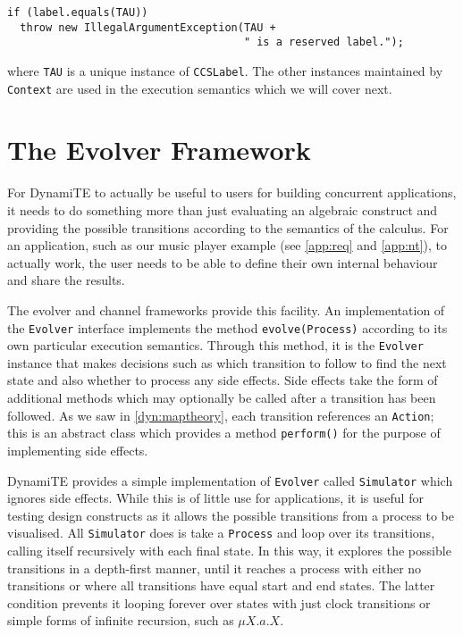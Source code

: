 \begin{verbatim}
if (label.equals(TAU))
  throw new IllegalArgumentException(TAU +
                                     " is a reserved label.");
\end{verbatim}

\noindent where \texttt{TAU} is a unique instance of
\texttt{CCSLabel}.  The other instances maintained by \texttt{Context}
are used in the execution semantics which we will cover next.

\section{The Evolver Framework}
\label{dyn:evolvers}

For DynamiTE to actually be useful to users for building concurrent
applications, it needs to do something more than just evaluating an
algebraic construct and providing the possible transitions according
to the semantics of the calculus.  For an application, such as our
music player example (see \ref{app:req} and \ref{app:nt}), to actually
work, the user needs to be able to define their own internal behaviour
and share the results.

The evolver and channel frameworks provide this facility.  An
implementation of the \texttt{Evolver} interface implements the method
\texttt{evolve(Process)} according to its own particular execution
semantics.  Through this method, it is the \texttt{Evolver} instance
that makes decisions such as which transition to follow to find the
next state and also whether to process any side effects.  Side effects
take the form of additional methods which may optionally be called
after a transition has been followed.  As we saw in
\ref{dyn:maptheory}, each transition references an \texttt{Action};
this is an abstract class which provides a method \texttt{perform()}
for the purpose of implementing side effects.

DynamiTE provides a simple implementation of \texttt{Evolver} called
\texttt{Simulator} which ignores side effects.  While this is of
little use for applications, it is useful for testing design
constructs as it allows the possible transitions from a process to be
visualised.  All \texttt{Simulator} does is take a \texttt{Process}
and loop over its transitions, calling itself recursively with each
final state.  In this way, it explores the possible transitions in a
depth-first manner, until it reaches a process with either no
transitions or where all transitions have equal start and end states.
The latter condition prevents it looping forever over states with just
clock transitions or simple forms of infinite recursion, such as $\mu
X.a.X$.

